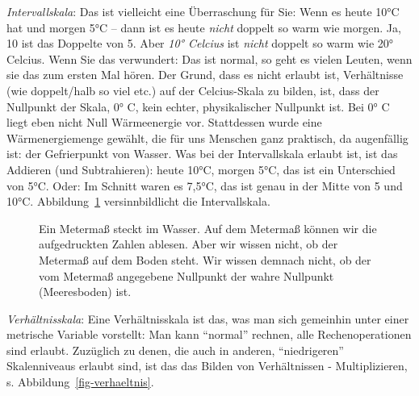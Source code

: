 \documentclass[
  a4paper,
  DIV=11]{scrreprt}
\theoremstyle{definition}
\theoremstyle{definition}
\theoremstyle{definition}
\theoremstyle{remark}
\begin{document}
\emph{Intervallskala}: Das ist vielleicht eine Überraschung für Sie:
Wenn es heute 10°C hat und morgen 5°C -- dann ist es heute \emph{nicht}
doppelt so warm wie morgen. Ja, 10 ist das Doppelte von 5. Aber
\emph{10° Celcius} ist \emph{nicht} doppelt so warm wie 20° Celcius.
Wenn Sie das verwundert: Das ist normal, so geht es vielen Leuten, wenn
sie das zum ersten Mal hören. Der Grund, dass es nicht erlaubt ist,
Verhältnisse (wie doppelt/halb so viel etc.) auf der Celcius-Skala zu
bilden, ist, dass der Nullpunkt der Skala, 0° C, kein echter,
physikalischer Nullpunkt ist. Bei 0° C liegt eben nicht Null
Wärmeenergie vor. Stattdessen wurde eine Wärmenergiemenge gewählt, die
für uns Menschen ganz praktisch, da augenfällig ist: der Gefrierpunkt
von Wasser. Was bei der Intervallskala erlaubt ist, ist das Addieren
(und Subtrahieren): heute 10°C, morgen 5°C, das ist ein Unterschied von
5°C. Oder: Im Schnitt waren es 7,5°C, das ist genau in der Mitte von 5
und 10°C. Abbildung~\ref{fig-intervall} versinnbildlicht die
Intervallskala.

\begin{figure}


\caption{\label{fig-intervall}Ein Metermaß steckt im Wasser. Auf dem
Metermaß können wir die aufgedruckten Zahlen ablesen. Aber wir wissen
nicht, ob der Metermaß auf dem Boden steht. Wir wissen demnach nicht, ob
der vom Metermaß angegebene Nullpunkt der wahre Nullpunkt (Meeresboden)
ist.}

\end{figure}%

\emph{Verhältnisskala}: Eine Verhältnisskala ist das, was man sich
gemeinhin unter einer metrische Variable vorstellt: Man kann ``normal''
rechnen, alle Rechenoperationen sind erlaubt. Zuzüglich zu denen, die
auch in anderen, ``niedrigeren'' Skalenniveaus erlaubt sind, ist das das
Bilden von Verhältnissen - Multiplizieren, s.
Abbildung~\ref{fig-verhaeltnis}.
\end{document}
